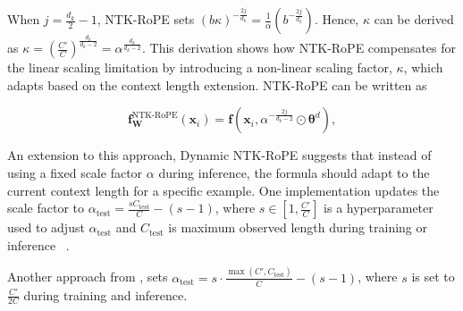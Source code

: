 \documentclass{article}
\begin{document}
When $j= \frac{d_k}{2}-1$, NTK-RoPE sets  $(b\kappa)^{-\frac{2j}{d_k}} = \frac{1}{\alpha} (b^{-\frac{2j}{d_k}})$. Hence, $\kappa$ can be derived as  $\kappa = (\frac{C'}{C})^{\frac{d_k}{d_k-2}} = \alpha^{\frac{d_k}{d_k-2}}$. This derivation shows how NTK-RoPE compensates for the linear scaling limitation by introducing a non-linear scaling factor, $\kappa$, which adapts based on the context length extension. NTK-RoPE can be written as 

\begin{equation}
 \mathbf{f}_\mathbf{W}^{\text{NTK-RoPE}}(\mathbf{x}_i) = \mathbf{f}(\mathbf{x}_i,   \alpha^{-\frac{2j}{d_k-2}} \odot \bm{\theta}^d),
\end{equation}

An extension to this approach, Dynamic NTK-RoPE suggests that instead of using a fixed scale factor $\alpha$ during inference, the formula should adapt to the current context length for a specific example. One implementation updates the scale factor to $\alpha_{\text{test}} = \frac{s C_\text{test}}{C} - (s - 1)$, where $s \in [1, \frac{C'}{C}]$ is a hyperparameter used to adjust $\alpha_{\text{test}}$ and $C_\text{test}$ is maximum observed length during training or inference ~\citep{fu2024data}.

Another approach from \citep{fu2024data}, sets $\alpha_{\text{test}} = s \cdot \frac{\max(C', C_\text{test})}{C}-(s-1)$, where $s$ is set to $\frac{C'}{2C}$ during training and inference.



\end{document}
